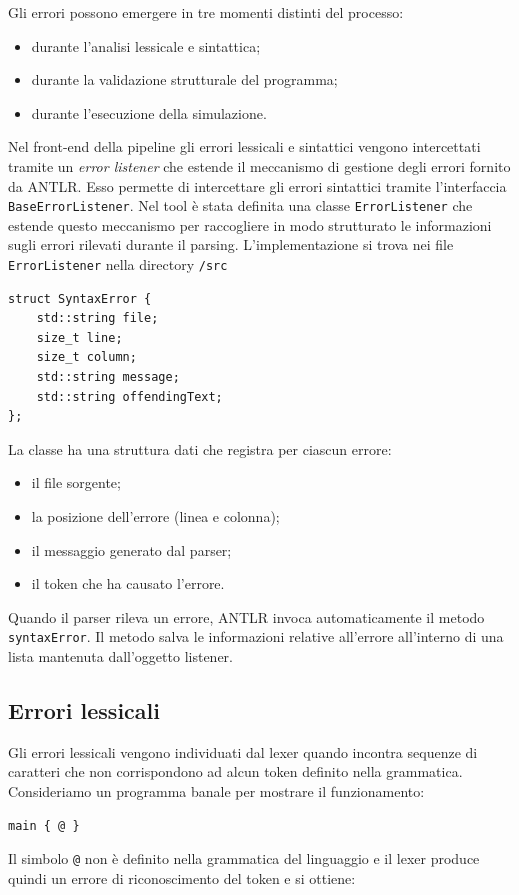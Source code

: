 Gli errori possono emergere in tre momenti distinti del processo:

\begin{itemize}
\item durante l'analisi lessicale e sintattica;
\item durante la validazione strutturale del programma;
\item durante l'esecuzione della simulazione.
\end{itemize}
Nel front-end della pipeline gli errori lessicali e sintattici vengono intercettati tramite un \textit{error listener} che estende il meccanismo di gestione degli errori fornito da ANTLR.
Esso permette di intercettare gli errori sintattici tramite l’interfaccia \texttt{BaseErrorListener}. Nel tool è stata definita una classe \texttt{ErrorListener} che estende questo meccanismo per raccogliere in modo strutturato le informazioni sugli errori rilevati durante il parsing.
L’implementazione si trova nei file \texttt{ErrorListener} nella directory \texttt{/src} \cite{rcparserrepo}

\begin{tcolorbox}[colback=white,colframe=black!35,boxrule=0.4pt]
\begin{lstlisting}
struct SyntaxError {
    std::string file;
    size_t line;
    size_t column;
    std::string message;
    std::string offendingText;
};
\end{lstlisting}
\end{tcolorbox}

La classe ha una struttura dati che registra per ciascun errore:

\begin{itemize}
\item il file sorgente;
\item la posizione dell’errore (linea e colonna);
\item il messaggio generato dal parser;
\item il token che ha causato l’errore.
\end{itemize}
Quando il parser rileva un errore, ANTLR invoca automaticamente il metodo \texttt{syntaxError}. Il metodo salva le informazioni relative all’errore all’interno di una lista mantenuta dall’oggetto listener.
\subsection*{Errori lessicali}

Gli errori lessicali vengono individuati dal lexer quando incontra sequenze di caratteri che non corrispondono ad alcun token definito nella grammatica.
Consideriamo un programma banale per mostrare il funzionamento:
\begin{tcolorbox}[colback=white,colframe=black!35,boxrule=0.4pt]
\begin{lstlisting}
main { @ }
\end{lstlisting}
\end{tcolorbox}
Il simbolo \texttt{@} non è definito nella grammatica del linguaggio e il lexer produce quindi un errore di riconoscimento del token e si ottiene:


